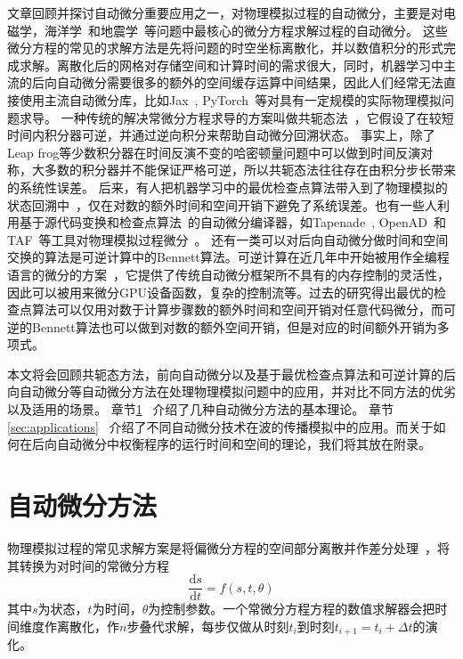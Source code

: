 \documentclass[A4,twoside,UTF8]{ctexart}
\def\D{\mathrm{d}}
\begin{document}
文章回顾并探讨自动微分重要应用之一，对物理模拟过程的自动微分，主要是对电磁学，海洋学~\cite{Heimbach2005}和地震学~\cite{Symes2007,Zhu2020}等问题中最核心的微分方程求解过程的自动微分。
这些微分方程的常见的求解方法是先将问题的时空坐标离散化，并以数值积分的形式完成求解。离散化后的网格对存储空间和计算时间的需求很大，同时，机器学习中主流的后向自动微分需要很多的额外的空间缓存运算中间结果，因此人们经常无法直接使用主流自动微分库，比如Jax~\cite{James2018}, PyTorch~\cite{Paszke2019}等对具有一定规模的实际物理模拟问题求导。
一种传统的解决常微分方程求导的方案叫做共轭态法~\cite{Plessix2006,Chen2018}，它假设了在较短时间内积分器可逆，并通过逆向积分来帮助自动微分回溯状态。
事实上，除了Leap frog等少数积分器在时间反演不变的哈密顿量问题中可以做到时间反演对称，大多数的积分器并不能保证严格可逆，所以共轭态法往往存在由积分步长带来的系统性误差。
后来，有人把机器学习中的最优检查点算法带入到了物理模拟的状态回溯中~\cite{Symes2007}，仅在对数的额外时间和空间开销下避免了系统误差。也有一些人利用基于源代码变换和检查点算法~\cite{Griewank1992}的自动微分编译器，如Tapenade~\cite{Hascoet2013}, OpenAD~\cite{Utke2008}和TAF~\cite{Heimbach2005}等工具对物理模拟过程微分~\cite{Forget2015}。
还有一类可以对后向自动微分做时间和空间交换的算法是可逆计算中的Bennett算法。可逆计算在近几年中开始被用作全编程语言的微分的方案~\cite{Liu2020b}，它提供了传统自动微分框架所不具有的内存控制的灵活性，因此可以被用来微分GPU设备函数，复杂的控制流等。过去的研究得出最优的检查点算法可以仅用对数于计算步骤数的额外时间和空间开销对任意代码微分，而可逆的Bennett算法也可以做到对数的额外空间开销，但是对应的时间额外开销为多项式。

   本文将会回顾共轭态方法，前向自动微分以及基于最优检查点算法和可逆计算的后向自动微分等自动微分方法在处理物理模拟问题中的应用，并对比不同方法的优劣以及适用的场景。
章节\ref{sec:forwardbackward}~ 介绍了几种自动微分方法的基本理论。
章节\ref{sec:applications}~ 介绍了不同自动微分技术在波的传播模拟中的应用。而关于如何在后向自动微分中权衡程序的运行时间和空间的理论，我们将其放在附录。

\section{自动微分方法}\label{sec:forwardbackward}

    物理模拟过程的常见求解方案是将偏微分方程的空间部分离散并作差分处理~\cite{Grote2010}，将其转换为对时间的常微分方程
    $$\frac{\D s}{\D t} = f(s, t, \theta)$$
其中$s$为状态，$t$为时间，$\theta$为控制参数。一个常微分方程方程的数值求解器会把时间维度作离散化，作$n$步叠代求解，每步仅做从时刻$t_i$到时刻$t_{i+1} = t_{i}+\Delta t$的演化。
\end{document}
